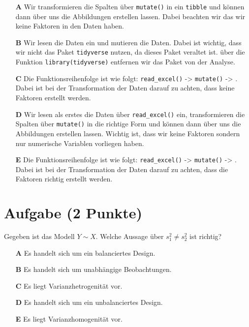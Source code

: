 \documentclass[a4paper, 9pt]{scrartcl}\usepackage[]{graphicx}\usepackage[]{xcolor}
\begin{document}
\begin{enumerate}
\item [\textbf{A} \msquare] Wir transformieren die Spalten über \texttt{mutate()} in ein \texttt{tibble} und können dann über  uns die Abbildungen erstellen lassen. Dabei beachten wir das wir keine Faktoren in den Daten haben.
\item [\textbf{B} \msquare] Wir lesen die Daten ein und mutieren die Daten. Dabei ist wichtig, dass wir nicht das Paket \texttt{tidyverse} nutzen, da dieses Paket veraltet ist. über die Funktion \texttt{library(tidyverse)} entfernen wir das Paket von der Analyse.
\item [\textbf{C} \msquare] Die Funktionsreihenfolge ist wie folgt: \texttt{read\_excel()} ->  \texttt{mutate()} -> . Dabei ist bei der Transformation der Daten darauf zu achten, dass keine Faktoren erstellt werden.
\item [\textbf{D} \msquare] Wir lesen als erstes die Daten über \texttt{read\_excel()} ein, transformieren die Spalten über \texttt{mutate()} in die richtige Form und können dann  über  uns die Abbildungen erstellen lassen. Wichtig ist, dass wir keine Faktoren sondern nur numerische Variablen vorliegen haben.
\item [\textbf{E} \msquare] Die Funktionsreihenfolge ist wie folgt: \texttt{read\_excel()} ->  \texttt{mutate()} -> . Dabei ist bei der Transformation der Daten darauf zu achten, dass die Faktoren richtig erstellt werden.
\end{enumerate}

\section{Aufgabe \hfill (2 Punkte)}



Gegeben ist das Modell $Y \sim X$. Welche Aussage über $s^2_1 \neq s^2_2$ ist richtig?



\begin{enumerate}
\item [\textbf{A} \msquare] Es handelt sich um ein balanciertes Design.
\item [\textbf{B} \msquare] Es handelt sich um unabhängige Beobachtungen.
\item [\textbf{C} \msquare] Es liegt Varianzhetrogenität vor.
\item [\textbf{D} \msquare] Es handelt sich um ein unbalanciertes Design.
\item [\textbf{E} \msquare] Es liegt Varianzhomogenität vor.
\end{enumerate}
\end{document}
